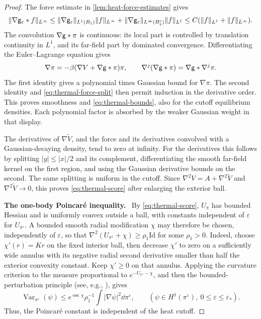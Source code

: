 \documentclass[11pt,reqno]{amsart}
\numberwithin{equation}{section}
\theoremstyle{plain}
\theoremstyle{remark}
\DeclarePairedDelimiter{\norm}{\lVert}{\rVert}
\newcommand{\parheading}[1]{\par\medskip\noindent\textbf{#1}\ }
\newcommand{\Id}{\mathrm{Id}}
\begin{document}
\begin{proof}
The force estimate in \cref{lem:heat-force-estimates} gives
\begin{equation}\label{eq:thermal-force-split}
 \norm{\nabla\g_\varepsilon*f}_{L^\infty}
 \le \norm{\nabla\g_\varepsilon}_{L^1(B_1)}\norm f_{L^\infty}
    +\norm{\nabla\g_\varepsilon}_{L^\infty(B_1^c)}\norm f_{L^1}
 \le C(\norm f_{L^1}+\norm f_{L^\infty}).
\end{equation}
The convolution $\nabla\mathsf g*\pi$ is continuous: its local part is controlled by translation continuity in $L^1$, and its far-field part by dominated convergence. Differentiating the Euler--Lagrange equation gives
\begin{equation}\label{eq:thermal-gradient-identity}
 \nabla\pi=-\beta(\nabla V+\nabla\mathsf g*\pi)\pi,
 \qquad
 \nabla^j(\nabla\mathsf g*\pi)=\nabla\mathsf g*\nabla^j\pi.
\end{equation}
The first identity gives a polynomial times Gaussian bound for $\nabla\pi$. The second identity and \eqref{eq:thermal-force-split} then permit induction in the derivative order. This proves smoothness and \eqref{eq:thermal-bounds}, also for the cutoff equilibrium densities. Each polynomial factor is absorbed by the weaker Gaussian weight in that display.

The derivatives of $\nabla\widetilde V$, and the force and its derivatives convolved with a Gaussian-decaying density, tend to zero at infinity. For the derivatives this follows by splitting $|y|\le|x|/2$ and its complement, differentiating the smooth far-field kernel on the first region, and using the Gaussian derivative bounds on the second. The same splitting is uniform in the cutoff. Since $\nabla^2V=A+\nabla^2\widetilde V$ and $\nabla^2\widetilde V\to0$, this proves \eqref{eq:thermal-score} after enlarging the exterior ball.

\parheading{The one-body Poincar\'e inequality.}
By \eqref{eq:thermal-score}, $U_\pi$ has bounded Hessian and is uniformly convex outside a ball, with constants independent of $\varepsilon$ for $U_{\pi^\varepsilon}$. A bounded smooth radial modification $\chi$ may therefore be chosen, independently of $\varepsilon$, so that $\nabla^2(U_{\pi^\varepsilon}+\chi)\ge\rho_1\Id$ for some $\rho_1>0$. Indeed, choose $\chi'(r)=Kr$ on the fixed interior ball, then decrease $\chi'$ to zero on a sufficiently wide annulus with its negative radial second derivative smaller than half the exterior convexity constant. Keep $\chi'\ge0$ on that annulus. Applying the curvature criterion to the measure proportional to $e^{-U_{\pi^\varepsilon}-\chi}$, and then the bounded-perturbation principle (see, e.g., \cite[Sections 4.2 and 4.8]{BGL}), gives
\begin{equation}\label{eq:thermal-Poincare-transfer}
 \operatorname{Var}_{\pi^\varepsilon}(\psi)
 \le e^{\operatorname{osc}\chi}\rho_1^{-1}
       \int|\nabla\psi|^2\dd\pi^\varepsilon,
 \qquad(\psi\in H^1(\pi^\varepsilon),\ 0\le\varepsilon\le\varepsilon_*).
\end{equation}
Thus, the Poincar\'e constant is independent of the heat cutoff.


\end{proof}
\end{document}
